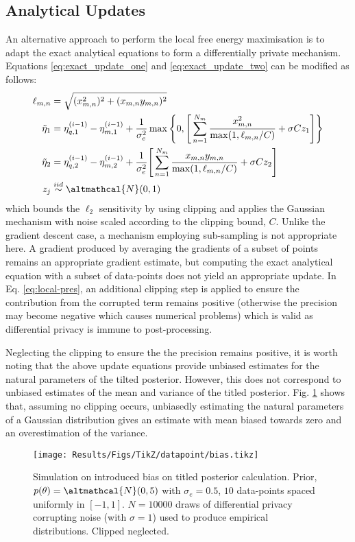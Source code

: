\subsection{Analytical Updates}
An alternative approach to perform the local free energy maximisation is to adapt the exact analytical equations to form a differentially private mechanism. Equations \eqref{eq:exact_update_one} and \eqref{eq:exact_update_two} can be modified as follows:
\begin{align}
\ell_{m, n} &= \sqrt{(x_{m, n}^2)^2 + (x_{m,n} y_{m,n})^2} \\
\tilde{\eta}_1 &= \eta_{q, 1}^{(i-1)} - \eta_{m, 1}^{(i-1)} + \frac{1}{\sigma_e^2} \max \Bigg \lbrace 0, \Bigg[ \sum_{n=1}^{N_m} \frac{x_{m,n}^2}{\max(1, \ell_{m,n} / C)} + \sigma C z_1 \Bigg] \Bigg \rbrace \label{eq:local-pres}\\ 
\tilde{\eta}_2 &= \eta_{q, 2}^{(i-1)} - \eta_{m, 2}^{(i-1)} + \frac{1}{\sigma_e^2} \Bigg[ \sum_{n=1}^{N_m} \frac{x_{m,n}y_{m,n}}{\max(1, \ell_{m,n} / C)} + \sigma C z_2 \Bigg] \\
z_j &\stackrel{iid}{\sim} \altmathcal{N}(0, 1)
\end{align}
which bounds the $\ell_2$ sensitivity by using clipping and applies the Gaussian mechanism with noise scaled according to the clipping bound, $C$. Unlike the gradient descent case, a mechanism employing sub-sampling is not appropriate here. A gradient produced by averaging the gradients of a subset of points remains an appropriate gradient estimate, but computing the exact analytical equation with a subset of data-points does not yield an appropriate update. In Eq. \eqref{eq:local-pres}, an additional clipping step is applied to ensure the contribution from the corrupted term remains positive (otherwise the precision may become negative which causes numerical problems) which is valid as differential privacy is immune to post-processing.

Neglecting the clipping to ensure the the precision remains positive, it is worth noting that the above update equations provide unbiased estimates for the natural parameters of the tilted posterior. However, this does not correspond to unbiased estimates of the mean and variance of the titled posterior. Fig. \ref{fig:results-local-bias} shows that, assuming no clipping occurs, unbiasedly estimating the natural parameters of a Gaussian distribution gives an estimate with mean biased towards zero and an overestimation of the variance.

\begin{figure}
	\texttt{[image: Results/Figs/TikZ/datapoint/bias.tikz]}
	\centering
	\caption{\label{fig:results-local-bias}Simulation on introduced bias on titled posterior calculation. Prior, $p(\theta) = \altmathcal{N}(0, 5)$ with $\sigma_e = 0.5$, $10$ data-points spaced uniformly in $[-1, 1]$. $N=10000$ draws of differential privacy corrupting noise (with $\sigma=1$) used to produce empirical distributions. Clipped neglected. }
\end{figure}

